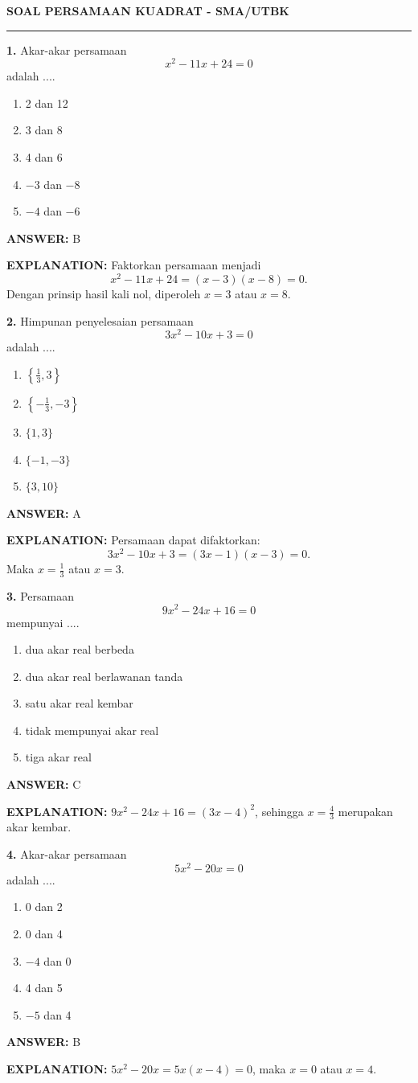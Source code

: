\documentclass[11pt,a4paper]{article}
\newcommand{\answer}[1]{\par\medskip\textbf{\color{jawab}ANSWER:} #1\par}
\newcommand{\explanation}[1]{\textbf{\color{jelas}EXPLANATION:} #1\par\medskip}
\newcommand{\question}[1]{\Needspace{7\baselineskip}\par\medskip\textbf{#1}\quad}
\newenvironment{choices}{\begin{enumerate}[label=\Alph*.,leftmargin=1.8em]}{\end{enumerate}}
\begin{document}
\begin{center}{\LARGE\bfseries SOAL PERSAMAAN KUADRAT - SMA/UTBK}\par\end{center}
\vspace{6pt}\hrule\vspace{8pt}
\question{1.} Akar-akar persamaan \[x^2-11x+24=0\] adalah ....
\begin{choices}\item 2 dan 12\item 3 dan 8\item 4 dan 6\item $-3$ dan $-8$\item $-4$ dan $-6$\end{choices}
\answer{B}\explanation{Faktorkan persamaan menjadi \[x^2-11x+24=(x-3)(x-8)=0.\] Dengan prinsip hasil kali nol, diperoleh $x=3$ atau $x=8$.}
\question{2.} Himpunan penyelesaian persamaan \[3x^2-10x+3=0\] adalah ....
\begin{choices}\item $\left\{\frac13,3\right\}$\item $\left\{-\frac13,-3\right\}$\item $\{1,3\}$\item $\{-1,-3\}$\item $\{3,10\}$\end{choices}
\answer{A}\explanation{Persamaan dapat difaktorkan: \[3x^2-10x+3=(3x-1)(x-3)=0.\] Maka $x=\frac13$ atau $x=3$.}
\question{3.} Persamaan \[9x^2-24x+16=0\] mempunyai ....
\begin{choices}\item dua akar real berbeda\item dua akar real berlawanan tanda\item satu akar real kembar\item tidak mempunyai akar real\item tiga akar real\end{choices}
\answer{C}\explanation{$9x^2-24x+16=(3x-4)^2$, sehingga $x=\frac43$ merupakan akar kembar.}
\question{4.} Akar-akar persamaan \[5x^2-20x=0\] adalah ....
\begin{choices}\item 0 dan 2\item 0 dan 4\item $-4$ dan 0\item 4 dan 5\item $-5$ dan 4\end{choices}
\answer{B}\explanation{$5x^2-20x=5x(x-4)=0$, maka $x=0$ atau $x=4$.}
\end{document}

